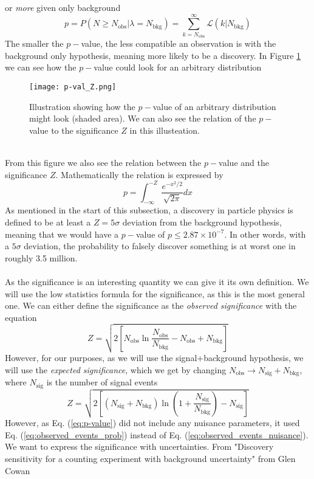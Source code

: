 \documentclass[12pt, a4paper]{book}
\begin{document}
or \textit{more} given only background
\begin{equation}\label{eq:p-value}
    p = P(N\ge N_{\text{obs}}\vert \lambda = N_{\text{bkg}}) = \sum_{k=N_{\text{obs}}}^{\infty}\mathcal{L}(k\vert N_{\text{bkg}})
\end{equation}
The smaller the $p-$value, the less compatible an observation is with the background only hypothesis, meaning more likely to be a discovery. In Figure \ref{fig:p-val} we can see how the $p-$value could look for an arbitrary distribution
\begin{figure}[!ht]
    \centering
    \texttt{[image: p-val\_Z.png]}
    \caption[$p-$value and significance $Z$ relation]{Illustration showing how the $p-$value of an arbitrary distribution might look (shaded area). We can also see the relation of the $p-$value to the significance $Z$ in this illusteation.}\label{fig:p-val}
\end{figure}
\\From this figure we also see the relation between the $p-$value and the significance $Z$. Mathematically the relation is expressed by
$$
    p = \int_{-\infty}^{-Z} \frac{e^{-x^2/2}}{\sqrt{2\pi}}dx
$$
As mentioned in the start of this subsection, a discovery in particle physics is defined to be at least a $Z=5\sigma$ deviation from the background hypothesis, meaning that we would have a $p-$value of $p\le2.87\times10^{-7}$. In other words, with a $5\sigma$ deviation, the probability to 
falsely discover something is at worst one in roughly 3.5 million.\\ 
\\As the significance is an interesting quantity we can give it its own definition. We will use the low statistics formula for the significance, 
as this is the most general one. We can either define the significance as the \textit{observed significance} with the equation
$$
    Z = \sqrt{2\left[N_{\text{obs}}\ln\frac{N_{\text{obs}}}{N_{\text{bkg}}}-N_{\text{obs}}+N_{\text{bkg}}\right]}
$$
However, for our purposes, as we will use the signal+background hypothesis, we will use the \textit{expected significance}, which we get by changing $N_{\text{obs}} \rightarrow N_{\text{sig}}+N_{\text{bkg}}$, where $N_{\text{sig}}$ is the number of signal events
\begin{equation}\label{eq:exp_sig}
    Z = \sqrt{2\left[(N_{\text{sig}}+N_{\text{bkg}})\ln\left(1+\frac{N_{\text{sig}}}{N_{\text{bkg}}}\right)-N_{\text{sig}}\right]}
\end{equation}
However, as Eq. (\ref{eq:p-value}) did not include any nuisance parameters, it used Eq. (\ref{eq:observed_events_prob}) instead of Eq. (\ref{eq:observed_events_nuisance}). We want to express the significance with uncertainties. From "Discovery sensitivity for a counting experiment with background uncertainty" from Glen Cowan
\end{document}
